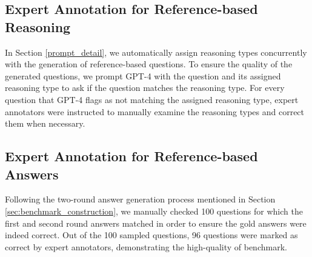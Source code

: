 \subsection{Expert Annotation for Reference-based Reasoning}
In Section \ref{prompt_detail}, we automatically assign reasoning types concurrently with the generation of reference-based questions. To ensure the quality of the generated questions, we prompt GPT-4 with the question and its assigned reasoning type to ask if the question matches the reasoning type. For every question that GPT-4 flags as not matching the assigned reasoning type, expert annotators were instructed to manually examine the reasoning types and correct them when necessary. 

\subsection{Expert Annotation for Reference-based Answers}
\label{2_round_checking}

Following the two-round answer generation process mentioned in Section \ref{sec:benchmark_construction}, we manually checked 100 questions for which the first and second round answers matched in order to ensure the gold answers were indeed correct. Out of the 100 sampled questions, 96 questions were marked as correct by expert annotators, demonstrating the high-quality of \data benchmark. 
